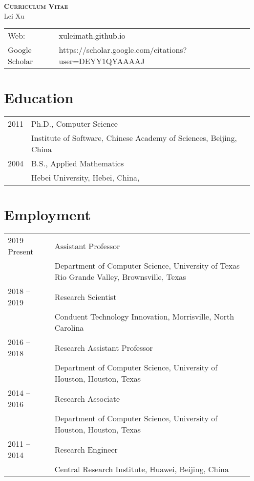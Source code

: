 





\begin{center}
    \textbf{\textsc{Curriculum Vitae}}\\
    Lei Xu
\end{center}

\begin{longtable}{p{1in}p{5in}}
    Web: &	xuleimath.github.io\\
    Google Scholar     &  https://scholar.google.com/citations?user=DEYY1QYAAAAJ \\
\end{longtable}

\section*{Education}

\begin{longtable}{p{1in}p{5in}}
    2011 &	Ph.D., Computer Science\\
         &  Institute of Software, Chinese Academy of Sciences, Beijing, China\\
    2004 &	B.S., Applied Mathematics\\
         &  Hebei University, Hebei, China, \\
\end{longtable}


\section*{Employment}
\begin{longtable}{p{1in}p{5in}}
    2019 – Present	&	Assistant Professor\\
                    &   Department of Computer Science, University of Texas Rio Grande Valley, Brownsville, Texas\\ 

    2018 – 2019		&Research Scientist\\
                    &Conduent Technology Innovation, Morrisville, North Carolina\\

    2016 – 2018		&Research Assistant Professor\\
                    &Department of Computer Science, University of Houston, Houston, Texas\\

    2014 – 2016		&Research Associate\\
                    &Department of Computer Science, University of Houston, Houston, Texas\\

    2011 – 2014		&Research Engineer\\
                    &Central Research Institute, Huawei, Beijing, China\\
\end{longtable}

